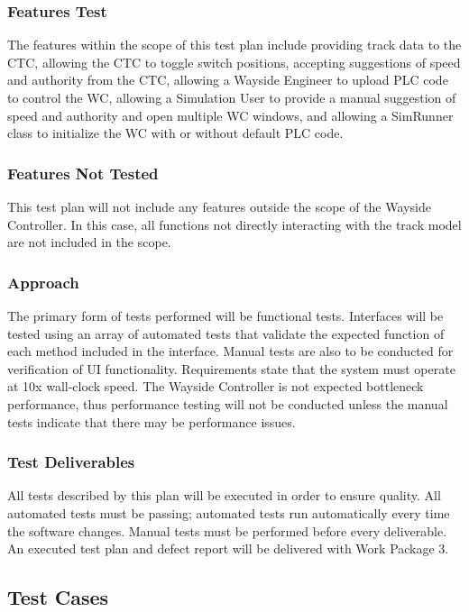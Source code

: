 \documentclass{scrreprt}
\begin{document}
        \subsubsection{Features Test}
        The features within the scope of this test plan include providing track data to the CTC, allowing the CTC to toggle switch positions, accepting suggestions of speed and authority from the CTC, allowing a Wayside Engineer to upload PLC code to control the WC, allowing a Simulation User to provide a manual suggestion of speed and authority and open multiple WC windows, and allowing a SimRunner class to initialize the WC with or without default PLC code.
        
        \subsubsection{Features Not Tested}
        This test plan will not include any features outside the scope of the Wayside Controller. In this case, all functions not directly interacting with the track model are not included in the scope.
        
        \subsubsection{Approach}
        The primary form of tests performed will be functional tests. Interfaces will be tested using an array of automated tests that validate the expected function of each method included in the interface. Manual tests are also to be conducted for verification of UI functionality. Requirements state that the system must operate at 10x wall-clock speed. The Wayside Controller is not expected bottleneck performance, thus performance testing will not be conducted unless the manual tests indicate that there may be performance issues.
        
        \subsubsection{Test Deliverables}
        All tests described by this plan will be executed in order to ensure quality. All automated tests must be passing; automated tests run automatically every time the software changes. Manual tests must be performed before every deliverable. An executed test plan and defect report will be delivered with Work Package 3.
        

        \subsection{Test Cases}
\end{document}
